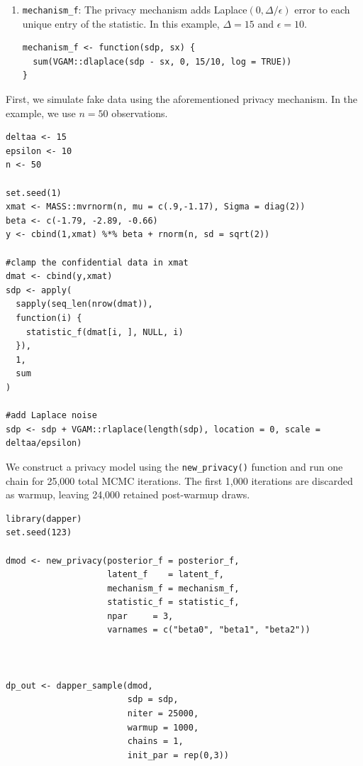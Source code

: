 \begin{enumerate}
\begin{verbatim}
statistic_f <- function(xi, sdp, i) {
  xic <- clamp_data(xi)
  ydp <- xic[1]
  xdp <- cbind(1,t(xic[-1]))

  s1 <- t(xdp) %*% ydp
  s2 <- t(ydp) %*% ydp
  s3 <- t(xdp) %*% xdp

  ur_s1 <- c(s1)
  ur_s2 <- c(s2)
  ur_s3 <- s3[upper.tri(s3,diag = TRUE)][-1]
  c(ur_s1,ur_s2,ur_s3)
}
\end{verbatim}
\item
  \texttt{mechanism\_f}: The privacy mechanism
  adds Laplace\((0, \Delta/\epsilon)\) error to each unique entry
  of the statistic. In this example, \(\Delta = 15\) and \(\epsilon = 10\).

\begin{verbatim}
mechanism_f <- function(sdp, sx) {
  sum(VGAM::dlaplace(sdp - sx, 0, 15/10, log = TRUE))
}
\end{verbatim}
\end{enumerate}

First, we simulate fake data using the aforementioned privacy mechanism.
In the example, we use \(n = 50\) observations.

\begin{verbatim}
deltaa <- 15
epsilon <- 10
n <- 50

set.seed(1)
xmat <- MASS::mvrnorm(n, mu = c(.9,-1.17), Sigma = diag(2))
beta <- c(-1.79, -2.89, -0.66)
y <- cbind(1,xmat) %*% beta + rnorm(n, sd = sqrt(2))

#clamp the confidential data in xmat
dmat <- cbind(y,xmat)
sdp <- apply(
  sapply(seq_len(nrow(dmat)), 
  function(i) {
    statistic_f(dmat[i, ], NULL, i)
  }),
  1,
  sum
)

#add Laplace noise 
sdp <- sdp + VGAM::rlaplace(length(sdp), location = 0, scale = deltaa/epsilon)
\end{verbatim}

We construct a privacy model using the \texttt{new\_privacy()} function and run one chain
for 25,000 total MCMC iterations. The first 1,000 iterations are discarded as
warmup, leaving 24,000 retained post-warmup draws.

\begin{verbatim}
library(dapper)
set.seed(123)

dmod <- new_privacy(posterior_f = posterior_f,
                    latent_f    = latent_f,
                    mechanism_f = mechanism_f,
                    statistic_f = statistic_f,
                    npar     = 3,
                    varnames = c("beta0", "beta1", "beta2"))



dp_out <- dapper_sample(dmod,
                        sdp = sdp,
                        niter = 25000,
                        warmup = 1000,
                        chains = 1,
                        init_par = rep(0,3))
\end{verbatim}

